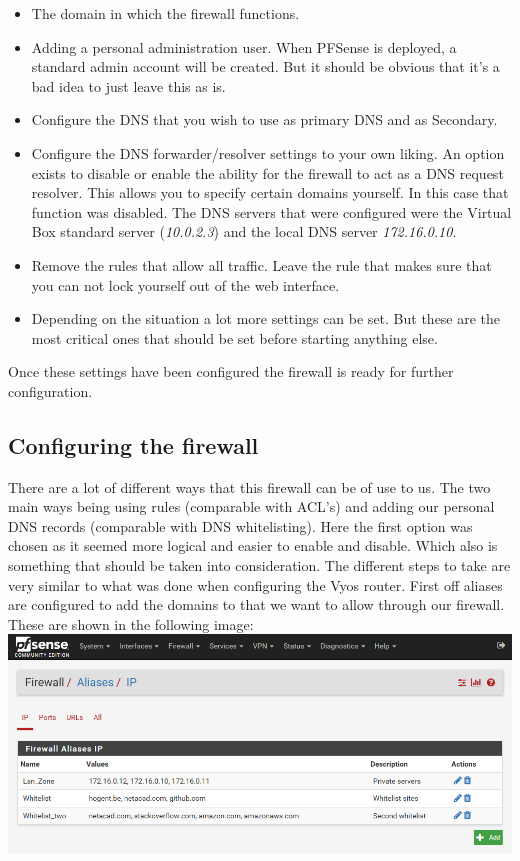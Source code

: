 \begin{itemize}
\item The domain in which the firewall functions.
\item Adding a personal administration user. When PFSense is deployed, a standard admin account will be created. But it should be obvious that it's a bad idea to just leave this as is. 
\item Configure the DNS that you wish to use as primary DNS and as Secondary. 
\item Configure the DNS forwarder/resolver settings to your own liking. An option exists to disable or enable the ability for the firewall to act as a DNS request resolver. This allows you to specify certain domains yourself. In this case that function was disabled. The DNS servers that were configured were the Virtual Box standard server (\textit{10.0.2.3}) and the local DNS server \textit{172.16.0.10}.
\item Remove the rules that allow all traffic. Leave the rule that makes sure that you can not lock yourself out of the web interface.
\item Depending on the situation a lot more settings can be set. But these are the most critical ones that should be set before starting anything else.
\end{itemize} 

Once these settings have been configured the firewall is ready for further configuration.
\subsection{Configuring the firewall}
There are a lot of different ways that this firewall can be of use to us. The two main ways being using rules (comparable with ACL's) and adding our personal DNS records (comparable with DNS whitelisting). Here the first option was chosen as it seemed more logical and easier to enable and disable. Which also is something that should be taken into consideration.
The different steps to take are very similar to what was done when configuring the Vyos router. First off aliases are configured to add the domains to that we want to allow through our firewall. These are shown in the following image:
\includegraphics[width=\textwidth]{img/Pfsense_Alias.png}

